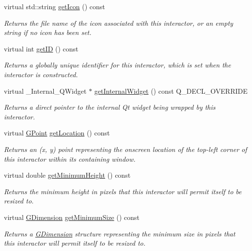 \begin{DoxyCompactItemize}
virtual std\+::string \mbox{\hyperlink{classGInteractor_aaed62a73004939a64da6f0eb9eb64d73}{get\+Icon}} () const
\begin{DoxyCompactList}\small\item\em Returns the file name of the icon associated with this interactor, or an empty string if no icon has been set. \end{DoxyCompactList}\item 
virtual int \mbox{\hyperlink{classGInteractor_a9c9659a6c6ba66b4107ba59c95a24241}{get\+ID}} () const
\begin{DoxyCompactList}\small\item\em Returns a globally unique identifier for this interactor, which is set when the interactor is constructed. \end{DoxyCompactList}\item 
virtual \+\_\+\+Internal\+\_\+\+Q\+Widget $\ast$ \mbox{\hyperlink{classGTable_a208ce13c1da40bf0ddb509daf99d6588}{get\+Internal\+Widget}} () const Q\+\_\+\+D\+E\+C\+L\+\_\+\+O\+V\+E\+R\+R\+I\+DE
\begin{DoxyCompactList}\small\item\em Returns a direct pointer to the internal Qt widget being wrapped by this interactor. \end{DoxyCompactList}\item 
virtual \mbox{\hyperlink{classGPoint}{G\+Point}} \mbox{\hyperlink{classGInteractor_a4f83802015511edeb63b892830812c11}{get\+Location}} () const
\begin{DoxyCompactList}\small\item\em Returns an (x, y) point representing the onscreen location of the top-\/left corner of this interactor within its containing window. \end{DoxyCompactList}\item 
virtual double \mbox{\hyperlink{classGInteractor_aed4b0075fcc434499c3cb3e46896bda3}{get\+Minimum\+Height}} () const
\begin{DoxyCompactList}\small\item\em Returns the minimum height in pixels that this interactor will permit itself to be resized to. \end{DoxyCompactList}\item 
virtual \mbox{\hyperlink{classGDimension}{G\+Dimension}} \mbox{\hyperlink{classGInteractor_a66b5af0b32493b4d597ca0a3df2049ea}{get\+Minimum\+Size}} () const
\begin{DoxyCompactList}\small\item\em Returns a \mbox{\hyperlink{classGDimension}{G\+Dimension}} structure representing the minimum size in pixels that this interactor will permit itself to be resized to. \end{DoxyCompactList}\item 

\end{DoxyCompactItemize}
